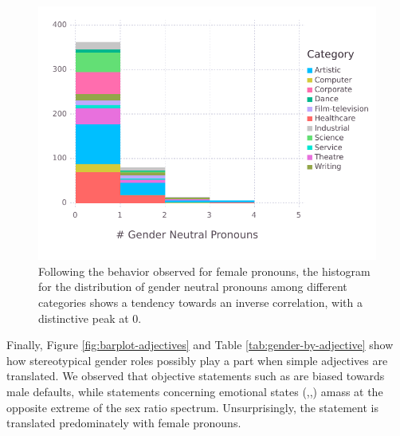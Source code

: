 \documentclass[jair,twoside,11pt,theapa]{article}
\begin{document}
\begin{figure}[H]
  \centering
  \includegraphics[width=\linewidth]{pictures/histogram-neutral}
  \caption{Following the behavior observed for female pronouns, the histogram for the distribution of gender neutral pronouns among different categories shows a tendency towards an inverse correlation, with a distinctive peak at 0.}
  \label{fig:histogram-neutral}
\end{figure}

Finally, Figure \ref{fig:barplot-adjectives} and Table \ref{tab:gender-by-adjective} show how stereotypical gender roles possibly play a part when simple adjectives are translated. We observed that objective statements such as  are biased towards male defaults, while statements concerning emotional states (,,) amass at the opposite extreme of the sex ratio spectrum. Unsurprisingly, the statement  is translated predominately with female pronouns.
\end{document}
